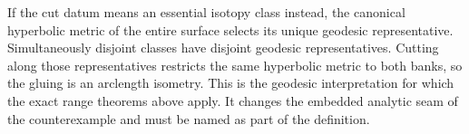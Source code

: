 If the cut datum means an essential isotopy class instead, the
canonical hyperbolic metric of the entire surface selects its
unique geodesic representative. Simultaneously disjoint classes
have disjoint geodesic representatives. Cutting along those
representatives restricts the same hyperbolic metric to both
banks, so the gluing is an arclength isometry. This is the
geodesic interpretation for which the exact range theorems
above apply. It changes the embedded analytic seam of the
counterexample and must be named as part of the definition.
